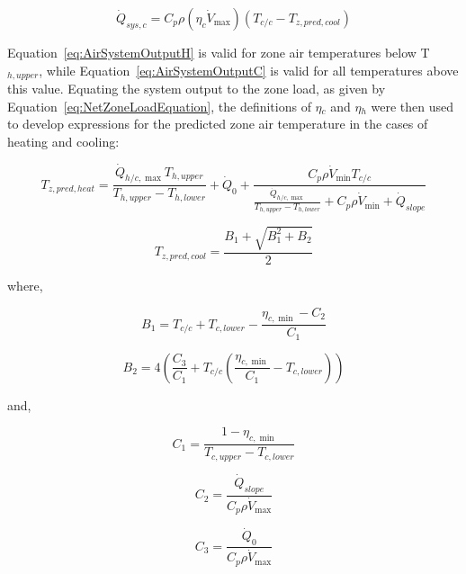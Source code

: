 \begin{equation}
{\dot Q_{sys,c}} = {C_p}\rho \left( {{\eta_c}{{\dot V}_{\max }}} \right)\left( {{T_{c/c}} - {T_{z,pred,cool}}} \right)
\label{eq:AirSystemOutputC}
\end{equation}

Equation~\ref{eq:AirSystemOutputH} is valid for zone air temperatures below T\(_{h,upper}\), while Equation~\ref{eq:AirSystemOutputC} is valid for all temperatures above this value. Equating the system output to the zone load, as given by Equation~\ref{eq:NetZoneLoadEquation}, the definitions of $\eta$\(_{c}\) and $\eta$\(_{h}\) were then used to develop expressions for the predicted zone air temperature in the cases of heating and cooling:

\begin{equation}
{T_{z,pred,heat}} = \frac{{{{\dot Q}_{h/c,\max }}{T_{h,upper}}}}{{{T_{h,upper}} - {T_{h,lower}}}} + {\dot Q_0} + \frac{{{C_p}\rho {{\dot V}_{\min }}{T_{c/c}}}}{{\frac{{{{\dot Q}_{h/c,\max }}}}{{{T_{h,upper}} - {T_{h,lower}}}} + {C_p}\rho {{\dot V}_{\min }} + {{\dot Q}_{slope}}}}
\label{eq:PredictedZoneAirTempHeat}
\end{equation}

\begin{equation}
{T_{z,pred,cool}} = \frac{{{B_1} + \sqrt {B_1^2 + {B_2}} }}{2}
\label{eq:PredictedZoneAirTempCool}
\end{equation}

where,

\begin{equation}
{B_1} = {T_{c/c}} + {T_{c,lower}} - \frac{{{\eta_{c,\min }} - {C_2}}}{{{C_1}}}
\end{equation}

\begin{equation}
{B_2} = 4\left( {\frac{{{C_3}}}{{{C_1}}} + {T_{c/c}}\left( {\frac{{{\eta_{c,\min }}}}{{{C_1}}} - {T_{c,lower}}} \right)} \right)
\end{equation}

and,

\begin{equation}
{C_1} = \frac{{1 - {\eta_{c,\min }}}}{{{T_{c,upper}} - {T_{c,lower}}}}
\end{equation}

\begin{equation}
{C_2} = \frac{{{{\dot Q}_{slope}}}}{{{C_p}\rho {{\dot V}_{\max }}}}
\end{equation}

\begin{equation}
{C_3} = \frac{{{{\dot Q}_0}}}{{{C_p}\rho {{\dot V}_{\max }}}}
\end{equation}

